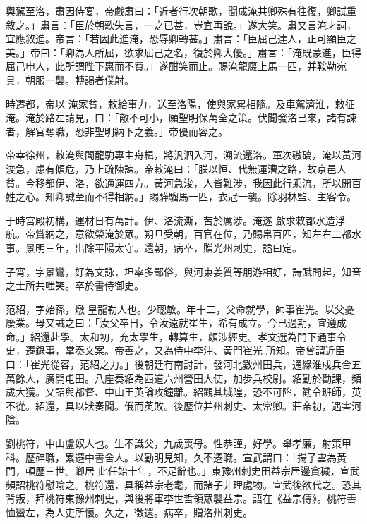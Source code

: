 \begin{pinyinscope}
 輿駕至洛，肅因侍宴，帝戲肅曰：「近者行次朝歌，聞成淹共卿殊有往復，卿試重敘之。」肅言：「臣於朝歌失言，一之已甚，豈宜再說。」遂大笑。肅又言淹才詞，宜應敘進。帝言：「若因此進淹，恐辱卿轉甚。」肅言：「臣屈己達人，正可顯臣之美。」帝曰：「卿為人所屈，欲求屈己之名，復於卿大優。」肅言：「淹既蒙進，臣得屈己申人，此所謂陛下惠而不費。」遂酣笑而止。賜淹龍廄上馬一匹，并鞍勒宛具，朝服一襲。轉謁者僕射。



 時遷都，帝以
 淹家貧，敕給事力，送至洛陽，使與家累相隨。及車駕濟淮，敕征淹。淹於路左請見，曰：「敵不可小，願聖明保萬全之策。伏聞發洛已來，諸有諫者，解官奪職，恐非聖明納下之義。」帝優而容之。



 帝幸徐州，敕淹與閭龍駒專主舟楫，將汎泗入河，溯流還洛。軍次磝碻，淹以黃河浚急，慮有傾危，乃上疏陳諫。帝敕淹曰：「朕以恒、代無運漕之路，故京邑人貧。今移都伊、洛，欲通運四方。黃河急浚，人皆難涉，我因此行乘流，所以開百姓之心。知卿誠至而不得相納。」賜驊騮馬一匹，衣冠一襲。除羽林監、主客令。



 于時宮殿初構，運材日有萬計。伊、洛流澌，苦於厲涉。淹遂
 啟求敕都水造浮航。帝賞納之，意欲榮淹於眾。朔旦受朝，百官在位，乃賜帛百匹，知左右二都水事。景明三年，出除平陽太守。還朝，病卒，贈光州刺史，謚曰定。



 子宵，字景鸞，好為文詠，坦率多鄙俗，與河東姜質等朋游相好，詩賦間起，知音之士所共嗤笑。卒於書侍御史。



 范紹，字始孫，燉皇龍勒人也。少聰敏。年十二，父命就學，師事崔光。以父憂廢業。母又誡之曰：「汝父卒日，令汝遠就崔生，希有成立。今已過期，宜遵成命。」紹還赴學。太和初，充太學生，轉算生，頗涉經史。孝文選為門下通事令史，遷錄事，掌奏文案。帝善之，又為侍中李沖、黃門崔光
 所知。帝曾謂近臣曰：「崔光從容，范紹之力。」後朝廷有南討計，發河北數州田兵，通緣淮戍兵合五萬餘人，廣開屯田。八座奏紹為西道六州營田大使，加步兵校尉。紹勤於勸課，頻歲大獲。又詔與都督、中山王英論攻鐘離。紹觀其城隍，恐不可陷，勸令班師，英不從。紹還，具以狀奏聞。俄而英敗。後歷位并州刺史、太常卿。莊帝初，遇害河陰。



 劉桃符，中山盧奴人也。生不識父，九歲喪母。性恭謹，好學。舉孝廉，射策甲科。歷碎職，累遷中書舍人。以勤明見知，久不遷職。宣武謂曰：「揚子雲為黃門，頓歷三世。卿居
 此任始十年，不足辭也。」東豫州刺史田益宗居邊貪穢，宣武頻詔桃符慰喻之。桃符還，具稱益宗老耄，而諸子非理處物。宣武後欲代之。恐其背叛，拜桃符東豫州刺史，與後將軍李世哲領眾襲益宗。語在《益宗傳》。桃符善恤蠻左，為人吏所懷。久之，徵還。病卒，贈洛州刺史。




\end{pinyinscope}

